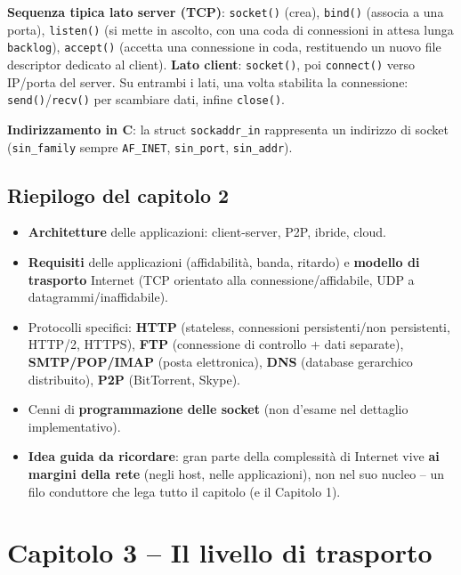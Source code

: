 \documentclass[12pt, a4paper]{article}
\begin{document}
\textbf{Sequenza tipica lato server (TCP)}: \texttt{socket()} (crea), \texttt{bind()} (associa a una porta), \texttt{listen()} (si mette in ascolto, con una coda di connessioni in attesa lunga \texttt{backlog}), \texttt{accept()} (accetta una connessione in coda, restituendo un nuovo file descriptor dedicato al client). \textbf{Lato client}: \texttt{socket()}, poi \texttt{connect()} verso IP/porta del server. Su entrambi i lati, una volta stabilita la connessione: \texttt{send()}/\texttt{recv()} per scambiare dati, infine \texttt{close()}.

\textbf{Indirizzamento in C}: la struct \texttt{sockaddr\_in} rappresenta un indirizzo di socket (\texttt{sin\_family} sempre \texttt{AF\_INET}, \texttt{sin\_port}, \texttt{sin\_addr}).

\subsection{Riepilogo del capitolo 2}

\begin{itemize}
    \item \textbf{Architetture} delle applicazioni: client-server, P2P, ibride, cloud.
    \item \textbf{Requisiti} delle applicazioni (affidabilità, banda, ritardo) e \textbf{modello di trasporto} Internet (TCP orientato alla connessione/affidabile, UDP a datagrammi/inaffidabile).
    \item Protocolli specifici: \textbf{HTTP} (stateless, connessioni persistenti/non persistenti, HTTP/2, HTTPS), \textbf{FTP} (connessione di controllo + dati separate), \textbf{SMTP/POP/IMAP} (posta elettronica), \textbf{DNS} (database gerarchico distribuito), \textbf{P2P} (BitTorrent, Skype).
    \item Cenni di \textbf{programmazione delle socket} (non d'esame nel dettaglio implementativo).
    \item \textcolor{blue!70!black}{\textbf{Idea guida da ricordare}}: gran parte della complessità di Internet vive \textbf{ai margini della rete} (negli host, nelle applicazioni), non nel suo nucleo -- un filo conduttore che lega tutto il capitolo (e il Capitolo 1).
\end{itemize}



\section{Capitolo 3 -- Il livello di trasporto}
\end{document}
